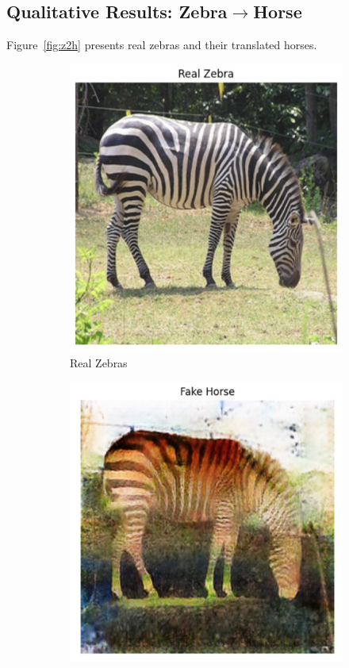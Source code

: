 \documentclass[11pt,a4paper]{article}
\begin{document}
\subsection{Qualitative Results: Zebra$\rightarrow$Horse}
Figure~\ref{fig:z2h} presents real zebras and their translated horses.
\begin{figure}[H]
    \centering
    \begin{subfigure}{0.48\textwidth}
        \includegraphics[width=\linewidth]{real_zebras.png}
        \caption{Real Zebras}
    \end{subfigure}\hfill
    \begin{subfigure}{0.48\textwidth}
        \includegraphics[width=\linewidth]{fake_horses.png}

\end{subfigure}
\end{figure}
\end{document}
